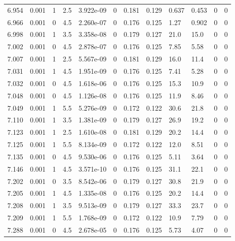 \documentclass[preview]{standalone}
\begin{document}
{{{{{{{\begin{tabular}{L{1.2cm}C{1.2cm} C{0.3cm}C{0.5cm} C{1.4cm}C{1.4cm} C{1.4cm}C{1.4cm} C{1.6cm}C{1.6cm} C{1.6cm}C{1.6cm}}
  6.954  &  0.001  & 1     & 2.5 &  3.922e-09  & 0  &  0.181&   0.129& 0.637 & 0.453   &  0 & 0  \\ 
  6.966  &  0.001  & 0     & 4.5 &  2.260e-07  & 0  &  0.176&   0.125& 1.27 & 0.902   &  0 & 0  \\ 
  6.998  &  0.001  & 1     & 3.5 &  3.358e-08  & 0  &  0.179&   0.127& 21.0 & 15.0   &  0 & 0  \\ 
  7.002  &  0.001  & 0     & 4.5 &  2.878e-07  & 0  &  0.176&   0.125& 7.85 & 5.58   &  0 & 0  \\ 
  7.007  &  0.001  & 1     & 2.5 &  5.567e-09  & 0  &  0.181&   0.129& 16.0 & 11.4   &  0 & 0  \\ 
  7.031  &  0.001  & 1     & 4.5 &  1.951e-09  & 0  &  0.176&   0.125& 7.41 & 5.28   &  0 & 0  \\ 
  7.032  &  0.001  & 0     & 4.5 &  1.618e-06  & 0  &  0.176&   0.125& 15.3 & 10.9   &  0 & 0  \\ 
  7.048  &  0.001  & 0     & 4.5 &  1.126e-08  & 0  &  0.176&   0.125& 11.9 & 8.46   &  0 & 0  \\ 
  7.049  &  0.001  & 1     & 5.5 &  5.276e-09  & 0  &  0.172&   0.122& 30.6 & 21.8   &  0 & 0  \\ 
  7.110  &  0.001  & 1     & 3.5 &  1.381e-09  & 0  &  0.179&   0.127& 26.9 & 19.2   &  0 & 0  \\ 
  7.123  &  0.001  & 1     & 2.5 &  1.610e-08  & 0  &  0.181&   0.129& 20.2 & 14.4   &  0 & 0  \\ 
  7.125  &  0.001  & 1     & 5.5 &  8.134e-09  & 0  &  0.172&   0.122& 12.0 & 8.51   &  0 & 0  \\ 
  7.135  &  0.001  & 0     & 4.5 &  9.530e-06  & 0  &  0.176&   0.125& 5.11 & 3.64   &  0 & 0  \\ 
  7.146  &  0.001  & 1     & 4.5 &  3.571e-10  & 0  &  0.176&   0.125& 31.1 & 22.1   &  0 & 0  \\ 
  7.202  &  0.001  & 0     & 3.5 &  8.542e-06  & 0  &  0.179&   0.127& 30.8 & 21.9   &  0 & 0  \\ 
  7.205  &  0.001  & 1     & 4.5 &  1.335e-08  & 0  &  0.176&   0.125& 20.2 & 14.4   &  0 & 0  \\ 
  7.208  &  0.001  & 1     & 3.5 &  9.513e-09  & 0  &  0.179&   0.127& 33.3 & 23.7   &  0 & 0  \\ 
  7.209  &  0.001  & 1     & 5.5 &  1.768e-09  & 0  &  0.172&   0.122& 10.9 & 7.79   &  0 & 0  \\ 
  7.288  &  0.001  & 0     & 4.5 &  2.678e-05  & 0  &  0.176&   0.125& 5.73 & 4.07   &  0 & 0  \\ 

\end{tabular}}}}}}}}
\end{document}
